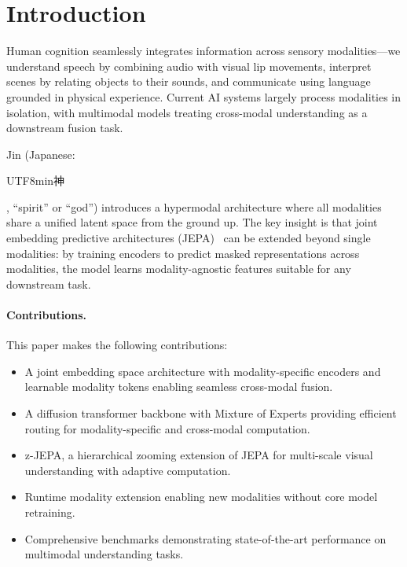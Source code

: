 \section{Introduction}


Human cognition seamlessly integrates information across sensory modalities---we understand speech by combining audio with visual lip movements, interpret scenes by relating objects to their sounds, and communicate using language grounded in physical experience. Current AI systems largely process modalities in isolation, with multimodal models treating cross-modal understanding as a downstream fusion task.

Jin (Japanese: \begin{CJK}{UTF8}{min}神\end{CJK}, ``spirit'' or ``god'') introduces a hypermodal architecture where all modalities share a unified latent space from the ground up. The key insight is that joint embedding predictive architectures (JEPA)~\cite{jepa2022} can be extended beyond single modalities: by training encoders to predict masked representations across modalities, the model learns modality-agnostic features suitable for any downstream task.

\paragraph{Contributions.} This paper makes the following contributions:
\begin{itemize}
    \item A joint embedding space architecture with modality-specific encoders and learnable modality tokens enabling seamless cross-modal fusion.
    \item A diffusion transformer backbone with Mixture of Experts providing efficient routing for modality-specific and cross-modal computation.
    \item z-JEPA, a hierarchical zooming extension of JEPA for multi-scale visual understanding with adaptive computation.
    \item Runtime modality extension enabling new modalities without core model retraining.
    \item Comprehensive benchmarks demonstrating state-of-the-art performance on multimodal understanding tasks.
\end{itemize}


